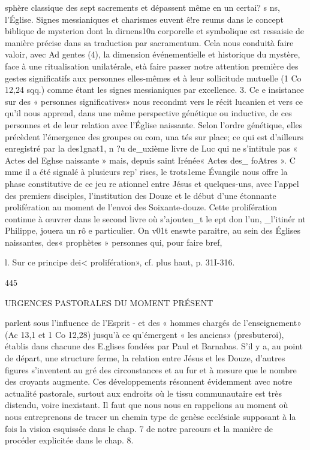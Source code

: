 sphère classique des sept sacrements et dépassent même en un certai? s ns, l'Église. Signes messianiques et charismes euvent ê!re reums dans le concept biblique de mysterion dont la dirnens10n corporelle et symbolique est ressaisie de manière précise dans sa traduction par sacramentum. Cela nous conduità faire valoir, avec Ad gentes (4), la dimension événementielle et historique du mystère, face à une ritualisation unilatérale, età faire passer notre attention première des gestes significatifs aux personnes elles-mêmes et à leur sollicitude mutuelle (1 Co 12,24 sqq.) comme étant les signes messianiques par excellence.
3. Ce e insistance sur des « personnes significatives» nous recondmt vers le récit lucanien et vers ce qu'il nous apprend, dans une même perspective génétique ou inductive, de ces personnes et de leur relation avec l'Église naissante. Selon l'ordre génétique, elles précèdent l'émergence des groupes ou com, una tés sur place; ce qui est d'ailleurs enregistré par la des1gnat1, n ?u de_uxième livre de Luc qui ne s'intitule pas
« Actes del Eghse naissante » mais, depuis saint Irénée« Actes des_ foAtres ». C mme il a été signalé à plusieurs rep' rises, le
trots1eme Évangile nous offre la phase constitutive de ce jeu
re ationnel entre Jésus et quelques-uns, avec l'appel des premiers disciples, l'institution des Douze et le début d'une étonnante prolifération au moment de l'envoi des Soixante-douze. Cette prolifération continue à œuvrer dans le second livre où s'ajouten_t le  ept don l'un, _l'itinér nt Philippe, jouera un rô e particulier. On v01t enswte paraitre, au sein des Églises naissantes, des« prophètes »  personnes qui, pour faire bref,

l. Sur ce principe dei< prolifération», cf. plus haut, p. 31I-316.

445
 
URGENCES PASTORALES DU MOMENT PRÉSENT

parlent sous l'influence de l'Esprit - et des « hommes chargés de l'enseignement» (Ac 13,1 et 1 Co 12,28) jusqu'à ce qu'émergent « les anciens» (presbuteroi), établis dans chacune des E.glises fondées par Paul et Barnabas. S'il y a, au point de départ, une structure ferme, la relation entre Jésus et les Douze, d'autres figures s'inventent au gré des circonstances et au fur et à mesure que le nombre des croyants augmente.
Ces développements résonnent évidemment avec notre actualité pastorale, surtout aux endroits où le tissu communautaire est très distendu, voire inexistant. Il faut que nous nous en rappelions au moment où nous entreprenons de tracer un chemin type de genèse ecclésiale supposant à la fois la vision esquissée dans le chap. 7 de notre parcours et la manière de procéder explicitée dans le chap. 8.



